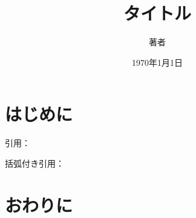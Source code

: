 \documentclass[uplatex,dvipdfmx]{jsarticle}
\begin{document}
\title{タイトル}
\author{著者}
\date{1970年1月1日}

\maketitle

\section{はじめに}\label{sec:introduction}

引用：~\textcite{latex_template_ja}

括弧付き引用：~\parencite{latex_template_ja}

\section{おわりに}\label{sec:conclusion}

\printbibliography[heading=bibliography, title={Bibliography}]
\end{document}
